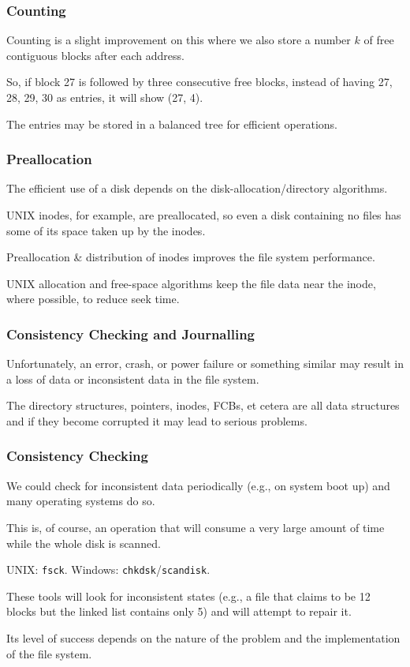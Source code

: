 \begin{frame}
\frametitle{Counting}

Counting is a slight improvement on this where we also store a number $k$ of free contiguous blocks after each address. 

So, if block 27 is followed by three consecutive free blocks, instead of having 27, 28, 29, 30 as entries, it will show (27, 4). 

The entries may be stored in a balanced tree for efficient operations.~



\end{frame}

\begin{frame}
\frametitle{Preallocation}

The efficient use of a disk depends on the disk-allocation/directory algorithms. 

UNIX inodes, for example, are preallocated, so even a disk containing no files has some of its space taken up by the inodes. 

Preallocation \& distribution of inodes improves the file system performance.

UNIX allocation and free-space algorithms keep the file data near the inode, where possible, to reduce seek time.


\end{frame}

\begin{frame}
\frametitle{Consistency Checking and Journalling}

Unfortunately, an error, crash, or power failure or something similar may result in a loss of data or inconsistent data in the file system. 

The directory structures, pointers, inodes, FCBs, et cetera are all data structures and if they become corrupted it may lead to serious problems.


\end{frame}

\begin{frame}
\frametitle{Consistency Checking}

We could check for inconsistent data periodically (e.g., on system boot up) and many operating systems do so. 

This is, of course, an operation that will consume a very large amount of time while the whole disk is scanned. 

UNIX: \texttt{fsck}. Windows: \texttt{chkdsk}/\texttt{scandisk}.

These tools will look for inconsistent states (e.g., a file that claims to be 12 blocks but the linked list contains only 5) and will attempt to repair it.

Its level of success depends on the nature of the problem and the implementation of the file system.

\end{frame}



